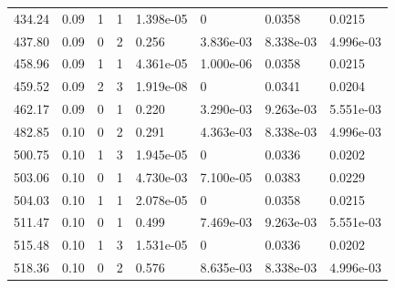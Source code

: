 \documentclass[preview]{standalone}
\begin{document}
{{{\begin{tabular}{L{1.2cm}C{1.2cm} C{0.3cm}C{0.5cm} C{1.4cm}C{1.4cm} C{1.4cm}C{1.4cm}}
  434.24  &  0.09  & 1     &  1 &  1.398e-05  & 0  & 0.0358 &  0.0215   \\ 
  437.80  &  0.09  & 0     &  2 &  0.256  & 3.836e-03  & 8.338e-03 &  4.996e-03   \\ 
  458.96  &  0.09  & 1     &  1 &  4.361e-05  & 1.000e-06  & 0.0358 &  0.0215   \\ 
  459.52  &  0.09  & 2     &  3 &  1.919e-08  & 0  & 0.0341 &  0.0204   \\ 
  462.17  &  0.09  & 0     &  1 &  0.220  & 3.290e-03  & 9.263e-03 &  5.551e-03   \\ 
  482.85  &  0.10  & 0     &  2 &  0.291  & 4.363e-03  & 8.338e-03 &  4.996e-03   \\ 
  500.75  &  0.10  & 1     &  3 &  1.945e-05  & 0  & 0.0336 &  0.0202   \\ 
  503.06  &  0.10  & 0     &  1 &  4.730e-03  & 7.100e-05  & 0.0383 &  0.0229   \\ 
  504.03  &  0.10  & 1     &  1 &  2.078e-05  & 0  & 0.0358 &  0.0215   \\ 
  511.47  &  0.10  & 0     &  1 &  0.499  & 7.469e-03  & 9.263e-03 &  5.551e-03   \\ 
  515.48  &  0.10  & 1     &  3 &  1.531e-05  & 0  & 0.0336 &  0.0202   \\ 
  518.36  &  0.10  & 0     &  2 &  0.576  & 8.635e-03  & 8.338e-03 &  4.996e-03   \\ 
\hline 
\end{tabular} 

}}}
\end{document}
